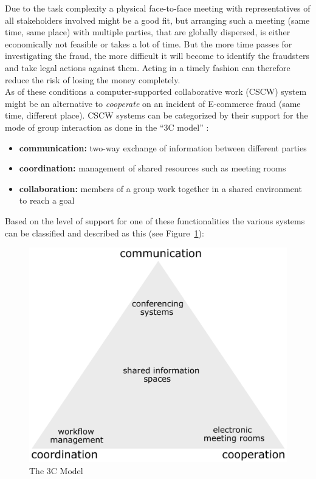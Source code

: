 Due to the task complexity a physical face-to-face meeting with representatives of all stakeholders involved might be a good fit, but arranging such a meeting (same time, same place) with multiple parties, that are globally dispersed, is either economically not feasible or takes a lot of time. But the more time passes for investigating the fraud, the more difficult it will become to identify the fraudsters and take legal actions against them. Acting in a timely fashion can therefore reduce the risk of losing the money completely. \\

As of these conditions a computer-supported collaborative work (\gls{CSCW}) system might be an alternative to \emph{cooperate} on an incident of \gls{E-commerce} fraud (same time, different place). \gls{CSCW} systems can be categorized by their support for the mode of group interaction as done in the ``3C model'' \citep{Koch2008}: \@

\begin{itemize}
    \item\textbf{communication:} two-way exchange of information between different parties
    \item\textbf{coordination:} management of shared resources such as meeting rooms
    \item\textbf{collaboration:} members of a group work together in a shared environment to reach a goal
\end{itemize}

Based on the level of support for one of these functionalities the various systems can be classified and described as this (see Figure~\ref{fig:images_3C_model}): \@

\begin{figure}[H]
	\centering
		\includegraphics[width=0.7\columnwidth]{images/3C-model.pdf}
	\caption[The 3C Model]{The 3C Model \citep{Koch2008}}
\label{fig:images_3C_model}
\end{figure}

